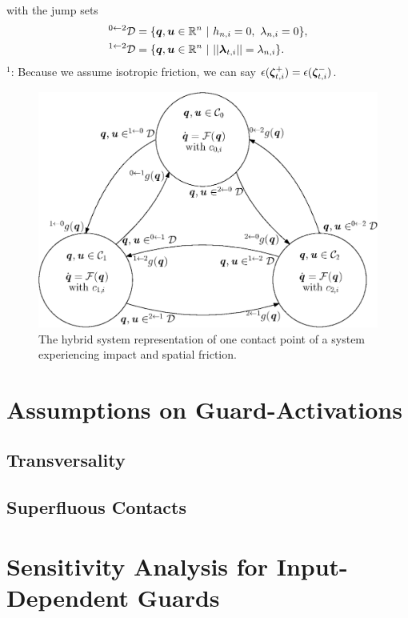 \documentclass[DC2017114Bouma.tex]{subfiles}
\begin{document}
with the jump sets
\begin{align}
&^{0\leftarrow 2}\mathcal{D}= \{\qb,\ub\in\Rbb^n\ |\ h_{n,i} = 0,\ \lambda_{n,i} = 0\},\\
&^{1\leftarrow 2}\mathcal{D} = \{\qb,\ub\in\Rbb^n\ |\ ||\lambdab_{t,i}||=\lambda_{n,i}\}.
\end{align}
$^1$: Because we assume isotropic friction, we can say $\epsilon(\boldsymbol{\zeta}^+_{t,i}) = \epsilon(\boldsymbol{\zeta}^-_{t,i})$.
\begin{figure}[H]
\centering
\includegraphics[width=.85\textwidth]{nodehybrid.eps}\caption{The hybrid system representation of one contact point of a system experiencing impact and spatial friction.}\label{fig:nodehybrid}
\end{figure}

\cleartooddpage
\chapter{Assumptions on Guard-Activations}
\section{Transversality}
\section{Superfluous Contacts}

\cleartooddpage
\chapter{Sensitivity Analysis for Input-Dependent Guards}
\end{document}
